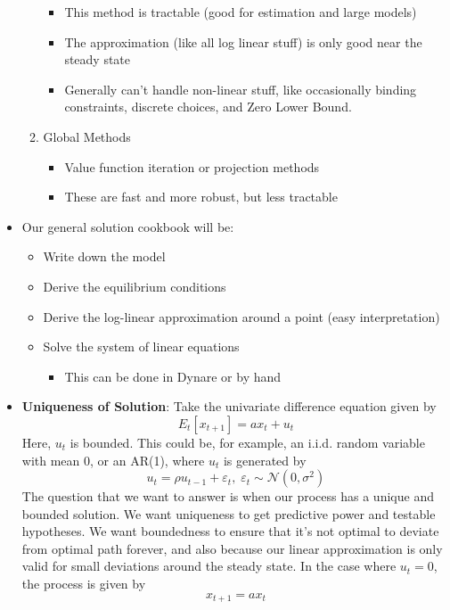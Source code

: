 \documentclass[12pt]{article}
\begin{document}
\begin{itemize}
\begin{enumerate}
\begin{itemize}
            \item This method is tractable (good for estimation and large models)
            \item The approximation (like all log linear stuff) is only good near the steady state
            \item Generally can't handle non-linear stuff, like occasionally binding constraints, discrete choices, and Zero Lower Bound.
        \end{itemize}
        \item Global Methods
        \begin{itemize}
            \item Value function iteration or projection methods
            \item These are fast and more robust, but less tractable
        \end{itemize}
    \end{enumerate}
    \item Our general solution cookbook will be:
    \begin{itemize}
        \item Write down the model
        \item Derive the equilibrium conditions
        \item Derive the log-linear approximation around a point (easy interpretation)
        \item Solve the system of linear equations
        \begin{itemize}
            \item This can be done in Dynare or by hand
        \end{itemize}
    \end{itemize}
    \item \textbf{Uniqueness of Solution}: Take the univariate difference equation given by
    \[E_t[x_{t+1}] = ax_t + u_t\]
    Here, $u_t$ is bounded. This could be, for example, an i.i.d. random variable with mean 0, or an AR(1), where $u_t$ is generated by
    \[u_t = \rho u_{t-1} + \varepsilon_t,\; \varepsilon_t \sim \mathcal{N}(0, \sigma^2)\]
    The question that we want to answer is when our process has a unique and bounded solution. We want uniqueness to get predictive power and testable hypotheses. We want boundedness to ensure that it's not optimal to deviate from optimal path forever, and also because our linear approximation is only valid for small deviations around the steady state. In the case where $u_t = 0$, the process is given by
    \[x_{t+1} = ax_t\]

\end{itemize}
\end{document}
